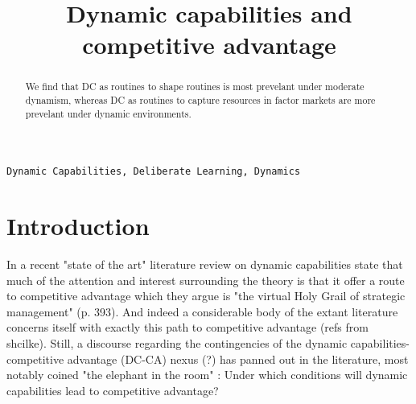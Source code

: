 \documentclass[review,fleqn]{elsarticle}\usepackage[]{graphicx}\usepackage[]{color}
\begin{document}
\begin{frontmatter}


\title{Dynamic capabilities and competitive advantage}





\begin{abstract}
 We find that DC as routines to shape routines is most prevelant under moderate dynamism,
whereas DC as routines to capture resources in factor markets are more prevelant under
dynamic environments. 

\end{abstract}

\begin{keyword}
\texttt{Dynamic Capabilities, Deliberate Learning, Dynamics }
\end{keyword}

\end{frontmatter}



\doublespacing


\section{Introduction}
In a recent "state of the art" literature review on dynamic capabilities
\cite{Schilke2018} state that much of the attention and interest surrounding the theory is
that it offer a route to competitive advantage which they argue is "the virtual Holy Grail
of strategic management" (p. 393). And indeed a considerable body of the extant literature
concerns itself with exactly this path to competitive advantage (refs from
shcilke). Still, a discourse regarding the contingencies of the dynamic
capabilities-competitive advantage (DC-CA) nexus (?) has panned out in the literature,
most notably coined "the elephant in the room" \citep{Peteraf2013}: Under which conditions
will dynamic capabilities lead to competitive advantage? 
\end{document}
